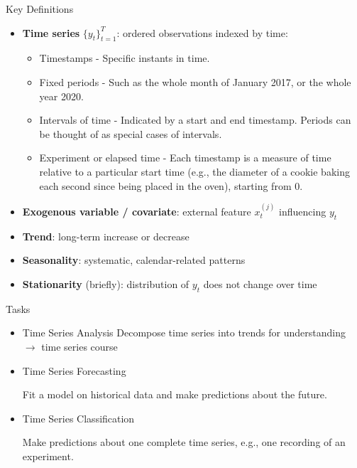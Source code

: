 \documentclass[11pt,compress,t,notes=noshow, xcolor=table]{beamer}
\begin{document}
\begin{vbframe}{Key Definitions}
  \begin{itemize}
    \item \textbf{Time series} $\{y_t\}_{t=1}^{T}$: ordered observations indexed by time:
    \begin{itemize}
        \item Timestamps - Specific instants in time.
        \item Fixed periods - Such as the whole month of January 2017, or the whole year 2020.
        \item Intervals of time - Indicated by a start and end timestamp. Periods can be thought of as special cases of intervals.
        \item Experiment or elapsed time - Each timestamp is a measure of time relative to a particular start time (e.g., the diameter of a cookie baking each second since being placed in the oven), starting from 0.
    \end{itemize}
    \item \textbf{Exogenous variable / covariate}: external feature $x^{(j)}_t$ influencing $y_t$
    \item \textbf{Trend}: long-term increase or decrease
    \item \textbf{Seasonality}: systematic, calendar-related patterns
    \item \textbf{Stationarity} (briefly): distribution of $y_t$ does not change over time
  \end{itemize}
\end{vbframe}

\begin{vbframe}{Tasks}
\vfill
    \begin{itemize}
        \item Time Series Analysis
        Decompose time series into trends for understanding $\rightarrow$ time series course
        
        \item Time Series Forecasting

        Fit a model on historical data and make predictions about the future.
        \item Time Series Classification

        Make predictions about one complete time series, e.g., one recording of an experiment.
    \end{itemize}
\vfill
\end{vbframe}
\end{document}
